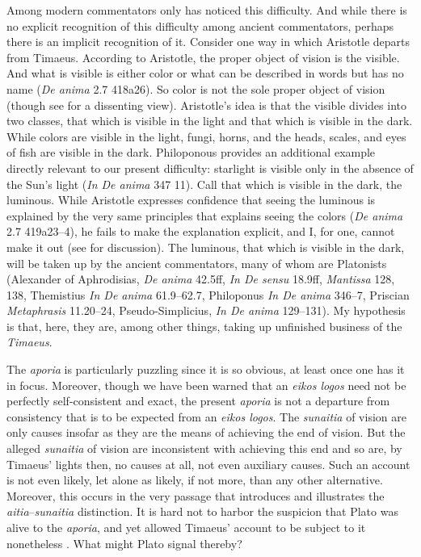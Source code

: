 Among modern commentators only \citet[180--1]{Broadie:2012vl} has noticed this difficulty. And while there is no explicit recognition of this difficulty among ancient commentators, perhaps there is an implicit recognition of it. Consider one way in which Aristotle departs from Timaeus. According to Aristotle, the proper object of vision is the visible. And what is visible is either color or what can be described in words but has no name (\emph{De anima} 2.7 418a26). So color is not the sole proper object of vision (though see \citealt[252]{Polansky:2007ly} for a dissenting view). Aristotle's idea is that the visible divides into two classes, that which is visible in the light and that which is visible in the dark. While colors are visible in the light, fungi, horns, and the heads, scales, and eyes of fish are visible in the dark. Philoponous provides an additional example directly relevant to our present difficulty: starlight is visible only in the absence of the Sun's light (\emph{In De anima} 347 11). Call that which is visible in the dark, the luminous. While Aristotle expresses confidence that seeing the luminous is explained by the very same principles that explains seeing the colors (\emph{De anima} 2.7 419a23--4), he fails to make the explanation explicit, and I, for one, cannot make it out (see \citealt[69--73]{Kalderon:2015fr} for discussion). The luminous, that which is visible in the dark, will be taken up by the ancient commentators, many of whom are Platonists (Alexander of Aphrodisias, \emph{De anima} 42.5ff, \emph{In De sensu} 18.9ff, \emph{Mantissa} 128, 138, Themistius \emph{In De anima} 61.9--62.7, Philoponus \emph{In De anima} 346--7, Priscian \emph{Metaphrasis} 11.20--24, Pseudo-Simplicius, \emph{In De anima} 129--131). My hypothesis is that, here, they are, among other things, taking up unfinished business of the \emph{Timaeus}.

The \emph{aporia} is particularly puzzling since it is so obvious, at least once one has it in focus. Moreover, though we have been warned that an \emph{eikos logos} need not be perfectly self-consistent and exact, the present \emph{aporia} is not a departure from consistency that is to be expected from an \emph{eikos logos}. The \emph{sunaitia} of vision are only causes insofar as they are the means of achieving the end of vision. But the alleged \emph{sunaitia} of vision are inconsistent with achieving this end and so are, by Timaeus' lights then, no causes at all, not even auxiliary causes. Such an account is not even likely, let alone as likely, if not more, than any other alternative. Moreover, this occurs in the very passage that introduces and illustrates the \emph{aitia}--\emph{sunaitia} distinction. It is hard not to harbor the suspicion that Plato was alive to the \emph{aporia}, and yet allowed Timaeus' account to be subject to it nonetheless \citep[180]{Broadie:2012vl}. What might Plato signal thereby? 

